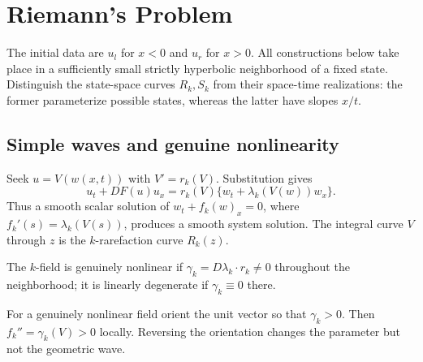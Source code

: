 \section{Riemann's Problem}
\label{sec:11-2}
The initial data are $u_l$ for $x<0$ and $u_r$ for $x>0$.
All constructions below take place in a sufficiently small strictly
hyperbolic neighborhood of a fixed state. Distinguish the state-space
curves $R_k,S_k$ from their space-time realizations: the former
parameterize possible states, whereas the latter have slopes $x/t$.

\subsection{Simple waves and genuine nonlinearity}
Seek $u=V(w(x,t))$ with $V'=r_k(V)$. Substitution gives
\[
 u_t+DF(u)u_x=r_k(V)\{w_t+\lambda_k(V(w))w_x\}.
\]
Thus a smooth scalar solution of $w_t+f_k(w)_x=0$, where
$f_k'(s)=\lambda_k(V(s))$, produces a smooth system solution.
The integral curve $V$ through $z$ is the $k$-rarefaction curve $R_k(z)$.
\begin{definition}[Source \S11.2.1]
The $k$-field is genuinely nonlinear if
$\gamma_k=D\lambda_k\cdot r_k\ne0$ throughout the neighborhood;
it is linearly degenerate if $\gamma_k\equiv0$ there.
\end{definition}
For a genuinely nonlinear field orient the unit vector so that
$\gamma_k>0$. Then $f_k''=\gamma_k(V)>0$ locally. Reversing the
orientation changes the parameter but not the geometric wave.

